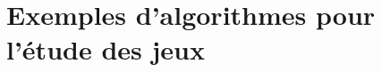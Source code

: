 %
%
%
%
%
%
%
%
%
%
%
%
%	
%
%
%
%

\chapter{Exemples d'algorithmes pour l'étude des jeux} \label{L16}

%
 


